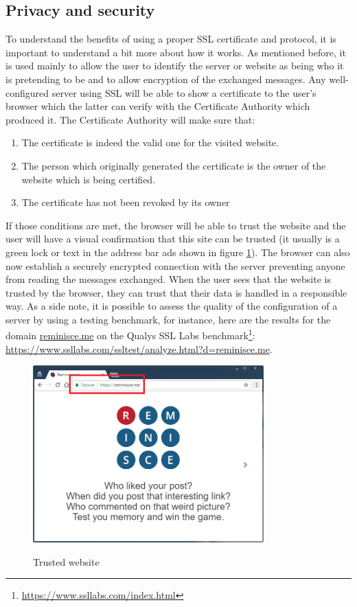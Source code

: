 \subsection{Privacy and security}\label{subsec:privacy}
To understand the benefits of using a proper SSL certificate and protocol, it is important to understand a bit more about how it works. As mentioned before, it is used mainly to allow the user to identify the server or website as being who it is pretending to be and to allow encryption of the exchanged messages. Any well-configured server using SSL will be able to show a certificate to the user's browser which the latter can verify with the Certificate Authority which produced it. The Certificate Authority will make sure that:
\begin{enumerate}
\item The certificate is indeed the valid one for the visited website.
\item The person which originally generated the certificate is the owner of the website which is being certified.
\item The certificate has not been revoked by its owner
\end{enumerate}
If those conditions are met, the browser will be able to trust the website and the user will have a visual confirmation that this site can be trusted (it usually is a green lock or text in the address bar ads shown in figure \ref{fig:sslBar}). The browser can also now establish a securely encrypted connection with the server preventing anyone from reading the messages exchanged. When the user sees that the website is trusted by the browser, they can trust that their data is handled in a responsible way. As a side note, it is possible to assess the quality of the configuration of a server by using a testing benchmark, for instance, here are the results for the domain \url{reminisce.me} on the Qualys SSL Labs benchmark\footnote{\url{https://www.ssllabs.com/index.html}}: \url{https://www.ssllabs.com/ssltest/analyze.html?d=reminisce.me}.
\begin{figure}[!h]
{\includegraphics[width=3.5in]{images/ssl_bar.png}}
\caption{Trusted website}
\label{fig:sslBar}
\end{figure}
